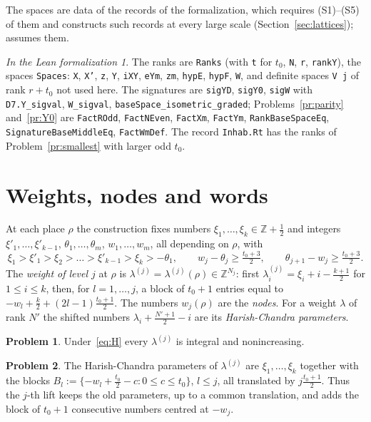 \documentclass[reqno]{amsart}
\theoremstyle{definition}
\newtheorem{problem}{Problem}[section]
\theoremstyle{plain}
\theoremstyle{remark}
\newtheorem*{leanremark}{In the Lean formalization}
\newcommand{\Z}{\mathbb Z}
\newcommand{\tl}[1]{\texttt{#1}}
\begin{document}
The spaces are data of the records of the formalization, which requires (S1)--(S5) of them and constructs such records at every large scale (Section~\ref{sec:lattices}); \cite[\S III.10, Hyp.~O12]{Rub} assumes them.

\begin{leanremark}
\raggedright The ranks are \tl{Ranks} (with \tl{t} for \(t_0\), \tl{N}, \tl{r}, \tl{rankY}), the spaces \tl{Spaces}: \tl{X}, \tl{X'}, \tl{z}, \tl{Y}, \tl{iXY}, \tl{eYm}, \tl{zm}, \tl{hypE}, \tl{hypF}, \tl{W}, and definite spaces \tl{V j} of rank \(r+t_0\) not used here.  The signatures are \tl{sigYD}, \tl{sigY0}, \tl{sigW} with \tl{D7.Y\_sigval}, \tl{W\_sigval}, \tl{baseSpace\_isometric\_graded}; Problems~\ref{pr:parity} and~\ref{pr:Y0} are \tl{FactROdd}, \tl{FactNEven}, \tl{FactXm}, \tl{FactYm}, \tl{RankBaseSpaceEq}, \tl{SignatureBaseMiddleEq}, \tl{FactWmDef}.  The record \tl{Inhab.Rt} has the ranks of Problem~\ref{pr:smallest} with larger odd \(t_0\).
\end{leanremark}

\section{Weights, nodes and words}\label{sec:weights}

At each place \(\rho\) the construction fixes numbers \(\xi_1,\dots,\xi_k\in\Z+\frac12\) and integers \(\xi'_1,\dots,\xi'_{k-1}\), \(\theta_1,\dots,\theta_m\), \(w_1,\dots,w_m\), all depending on \(\rho\), with
\begin{equation}\label{eq:H}
 \xi_1>\xi'_1>\xi_2>\dots>\xi'_{k-1}>\xi_k>-\theta_1,\qquad
 w_j-\theta_j\ge\tfrac{t_0+3}2,\qquad \theta_{j+1}-w_j\ge\tfrac{t_0+3}2 .
\end{equation}
The \emph{weight of level \(j\)} at \(\rho\) is \(\lambda^{(j)}=\lambda^{(j)}(\rho)\in\Z^{N_j}\): first \(\lambda^{(j)}_i=\xi_i+i-\frac{k+1}2\) for \(1\le i\le k\), then, for \(l=1,\dots,j\), a block of \(t_0+1\) entries equal to \(-w_l+\frac k2+(2l-1)\frac{t_0+1}2\).  The numbers \(w_j(\rho)\) are the \emph{nodes}.  For a weight \(\lambda\) of rank \(N'\) the shifted numbers \(\lambda_i+\frac{N'+1}2-i\) are its \emph{Harish-Chandra parameters}.

\begin{problem}\label{pr:dominant}
Under~\eqref{eq:H} every \(\lambda^{(j)}\) is integral and nonincreasing.
\end{problem}

\begin{problem}\label{pr:parameter}
The Harish-Chandra parameters of \(\lambda^{(j)}\) are \(\xi_1,\dots,\xi_k\) together with the blocks \(B_l:=\{-w_l+\frac{t_0}2-c:0\le c\le t_0\}\), \(l\le j\), all translated by \(j\frac{t_0+1}2\).  Thus the \(j\)-th lift keeps the old parameters, up to a common translation, and adds the block of \(t_0+1\) consecutive numbers centred at \(-w_j\).
\end{problem}
\end{document}

